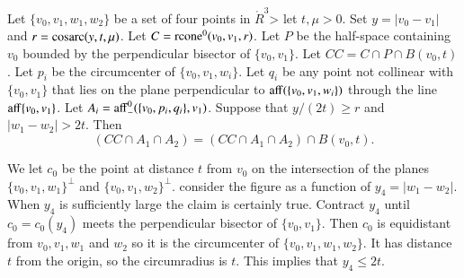 \begin{tarskidata}
\begin{tarski}

\begin{lemma}
Let $\{v_0,v_1,w_1,w_2\}$ be a set of four points in $\ring{R}^3$>
let $t,\mu > 0$.  Set $y=|v_0-v_1|$
and $r={\operatorname{cosarc}}(y,t,\mu)$.
Let $C={\operatorname{rcone}}^0(v_0,v_1,r)$.
Let $P$ be the half-space containing $v_0$ bounded by
the perpendicular bisector of  $\{v_0,v_1\}$.
Let $CC = C\cap P \cap B(v_0,t)$. %
Let $p_i$ be the circumcenter of $\{v_0,v_1,w_i\}$.  Let
$q_i$ be any point not collinear with $\{v_0,v_1\}$ that
lies on the plane perpendicular to ${\operatorname{aff}}(\{v_0,v_1,w_i\})$
through the line ${\operatorname{aff}}\{v_0,v_1\}$.
Let $A_i = {\operatorname{aff}}_-^0(\{v_0,p_i,q_i\},v_1)$.
Suppose that $y/(2t) \ge r$ and $|w_1-w_2| > 2t$.
Then
  $$
  (CC \cap A_1\cap A_2) =   (CC \cap A_1\cap A_2) \cap B(v_0,t).
  $$
\end{lemma}



\begin{proved}
We let $c_0$ be the point at distance $t$ from $v_0$ 
on the intersection of the
planes $\{v_0,v_1,w_1\}^\perp$ and $\{v_0,v_1,w_2\}^\perp$. 
consider the figure as a function of $y_4=|w_1-w_2|$. When $y_4$ is
sufficiently large the claim is certainly true.  Contract $y_4$ until
$c_0=c_0(y_4)$ meets the perpendicular bisector of $\{v_0,v_1\}$. Then $c_0$
is equidistant from $v_0,v_1,w_1$ and $w_2$ so it is the circumcenter of
$\{v_0,v_1,w_1,w_2\}$. It has distance $t$ from the origin, so the
circumradius is $t$. This implies that $y_4\le 2t$.
\swallowed\end{proved}
\end{tarski}






\begin{tarski}


\end{tarski}
\end{tarskidata}
